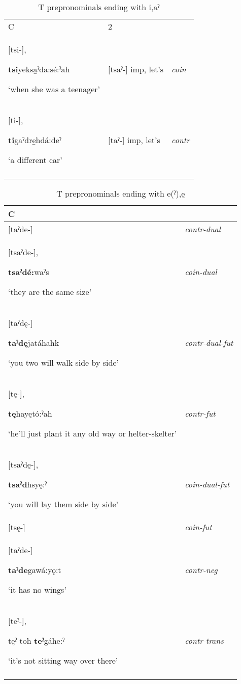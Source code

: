 
\begin{table}
\caption{T prepronominals ending with i,aˀ}
\label{tab:1:coinorcontr}
\scriptsize{
\begin{tabularx}{\textwidth}{XXX}
\lsptoprule
C & 2 & \\
{}[tsi-], 

\textbf{tsi}yeksa̱ˀda:sé:ˀah

‘when she was a teenager’ & [tsaˀ-] imp, let’s & {\itshape coin}\\
{}[ti-], 

\textbf{ti}gaˀdre̱hdá:deˀ

‘a different car’ & [taˀ-] imp, let’s & {\itshape contr}\\
\lspbottomrule
\end{tabularx}}
\end{table}


\begin{table}
\caption{T prepronominals ending with e(ˀ),ę}
\label{tab:1:coincontrother}
\scriptsize{
\begin{tabularx}{\textwidth}{XX}
\lsptoprule
C & \\
\midrule
{}[taˀde-] & {\itshape contr-dual}\\
{}[tsaˀde-], 

\textbf{tsaˀdé:}waˀs 

‘they are the same size’ & {\itshape coin-dual}\\
{}[taˀdę-] 

\textbf{taˀdę}jatáhahk 

‘you two will walk side by side’ & {\itshape contr-dual-fut}\\
{}[tę-], 

\textbf{tę}hayętó:ˀah 

‘he’ll just plant it any old way or helter-skelter’ & {\itshape contr-fut}\\
{}[tsaˀdę-], 

\textbf{tsaˀd\’{ę}}hsyę:ˀ 

‘you will lay them side by side’ & {\itshape coin-dual-fut}\\
{}[tsę-] & {\itshape coin-fut}\\
{}[taˀde-] 

\textbf{taˀde}gawá:yǫ:t 

‘it has no wings’ & {\itshape contr-neg}\\
{}[teˀ-], 

tęˀ toh \textbf{teˀ}gáhe:ˀ 

‘it’s not sitting way over there’ & {\itshape contr-trans}\\
\lspbottomrule
\end{tabularx}}
\end{table}


